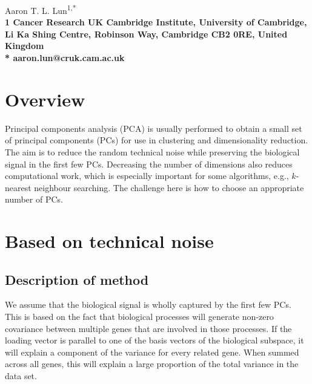 \documentclass{article}
\begin{document}
\vspace*{0.35in}

\begin{flushleft}
{\Large
\textbf{}
}
\newline

Aaron T. L. Lun\textsuperscript{1,*}
\\
\bigskip
\bf{1} Cancer Research UK Cambridge Institute, University of Cambridge, Li Ka Shing Centre, Robinson Way, Cambridge CB2 0RE, United Kingdom
\\
\bigskip
* aaron.lun@cruk.cam.ac.uk

\end{flushleft}

\section{Overview}
Principal components analysis (PCA) is usually performed to obtain a small set of principal components (PCs) for use in clustering and dimensionality reduction.
The aim is to reduce the random technical noise while preserving the biological signal in the first few PCs.
Decreasing the number of dimensions also reduces computational work, which is especially important for some algorithms, e.g., $k$-nearest neighbour searching.
The challenge here is how to choose an appropriate number of PCs.

\section{Based on technical noise}

\subsection{Description of method}

We assume that the biological signal is wholly captured by the first few PCs.
This is based on the fact that biological processes will generate non-zero covariance between multiple genes that are involved in those processes.
If the loading vector is parallel to one of the basis vectors of the biological subspace, it will explain a component of the variance for every related gene.
When summed across all genes, this will explain a large proportion of the total variance in the data set.
\end{document}
